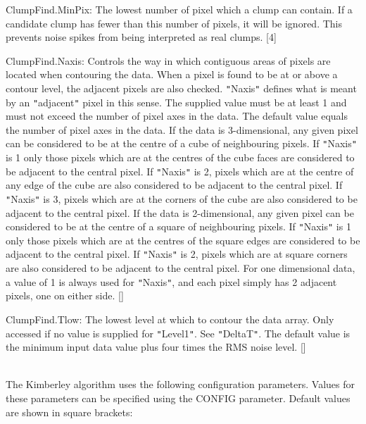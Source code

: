 \documentclass[twoside,11pt]{article}
\renewcommand{\_}{\texttt{\symbol{95}}}
\newcommand{\sstdiytopic}[2]{\item[{\hspace{-0.35em}#1\hspace{-0.35em}:}]
\mbox{} \\[1.3ex] #2}
\newcommand{\sstitem}{\item}
\newcommand{\sstdiytopic}[2]{\item[{#1}] #2 }
\newcommand{\sstitem}{\item}
\begin{document}
{{{         \sstitem
         ClumpFind.MinPix: The lowest number of pixel which a clump can
         contain. If a candidate clump has fewer than this number of pixels,
         it will be ignored. This prevents noise spikes from being interpreted
         as real clumps. [4]

         \sstitem
         ClumpFind.Naxis: Controls the way in which contiguous areas of
         pixels are located when contouring the data. When a pixel is found
         to be at or above a contour level, the adjacent pixels are also checked.
         {\tt "}Naxis{\tt "} defines what is meant by an {\tt "}adjacent{\tt "} pixel in this sense.
         The supplied value must be at least 1 and must not exceed the number
         of pixel axes in the data. The default value equals the number of
         pixel axes in the data. If the data is 3-dimensional, any given pixel
         can be considered to be at the centre of a cube of neighbouring pixels.
         If {\tt "}Naxis{\tt "} is 1 only those pixels which are at the centres of the cube
         faces are considered to be adjacent to the central pixel. If {\tt "}Naxis{\tt "}
         is 2, pixels which are at the centre of any edge of the cube are also
         considered to be adjacent to the central pixel. If {\tt "}Naxis{\tt "} is 3, pixels
         which are at the corners of the cube are also considered to be adjacent
         to the central pixel. If the data is 2-dimensional, any given pixel can
         be considered to be at the centre of a square of neighbouring pixels.
         If {\tt "}Naxis{\tt "} is 1 only those pixels which are at the centres of the
         square edges are considered to be adjacent to the central pixel. If
         {\tt "}Naxis{\tt "} is 2, pixels which are at square corners are also considered
         to be adjacent to the central pixel. For one dimensional data, a
         value of 1 is always used for {\tt "}Naxis{\tt "}, and each pixel simply has 2
         adjacent pixels, one on either side. []

         \sstitem
         ClumpFind.Tlow: The lowest level at which to contour the data
         array. Only accessed if no value is supplied for {\tt "}Level1{\tt "}. See {\tt "}DeltaT{\tt "}.
         The default value is the minimum input data value plus four times the
         RMS noise level. []
      }
   }
   \sstdiytopic{
      Kimberley Configuration Parameters
   }{
      The Kimberley algorithm uses the following configuration parameters.
      Values for these parameters can be specified using the CONFIG parameter.
      Default values are shown in square brackets:
   }
}
\end{document}
